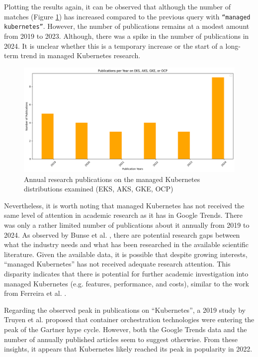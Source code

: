 Plotting the results again, it can be observed that although the number of matches (Figure \ref{fig:managed-k8s-broaden-scope}) has increased compared to the previous query with \texttt{``managed kubernetes''}. However, the number of publications remains at a modest amount from 2019 to 2023. Although, there was a spike in the number of publications in 2024. It is unclear whether this is a temporary increase or the start of a long-term trend in managed Kubernetes research.

\FloatBarrier


\begin{figure}
    \centering
    \includegraphics[width=1\linewidth]{resources/managed-k8s-broaden-scope.png}
    \caption{Annual research publications on the managed Kubernetes distributions examined (EKS, AKS, GKE, OCP)}
    \label{fig:managed-k8s-broaden-scope}
\end{figure}


Nevertheless, it is worth noting that managed Kubernetes has not received the same level of attention in academic research as it has in Google Trends. There was only a rather limited number of publications about it annually from 2019 to 2024. As observed by Bunse et al. \cite{BUNSE2011667}, there are potential research gaps between what the industry needs and what has been researched in the available scientific literature. Given the available data, it is possible that despite growing interests, ``managed Kubernetes'' has not received adequate research attention. This disparity indicates that there is potential for further academic investigation into managed Kubernetes (e.g. features, performance, and costs), similar to the work from Ferreira et al. \cite{pereiraferreiraPerformanceEvaluationContainers2019}.

Regarding the observed peak in publications on ``Kubernetes'', a 2019 study by Truyen et al. \cite{truyenComprehensiveFeatureComparison2019} proposed that container orchestration technologies were entering the peak of the Gartner hype cycle. However, both the Google Trends data and the number of annually published articles seem to suggest otherwise. From these insights, it appears that Kubernetes likely reached its peak in popularity in 2022.

